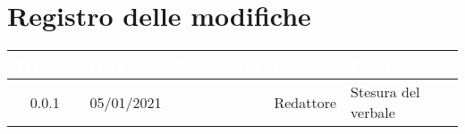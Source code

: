 \section*{Registro delle modifiche}
{
\renewcommand{\arraystretch}{1.5}
\centering
\begin{longtable}{c C{2.6cm}  C{2.6cm} C{2.6cm} C{3.5cm}}
\textcolor{white}{\textbf{Versione}}&
\textcolor{white}{\textbf{Data}}&
\textcolor{white}{\textbf{Nominativo}}&
\textcolor{white}{\textbf{Ruolo}}&
\textcolor{white}{\textbf{Descrizione}}\\	
\endhead
		

0.0.1 & 05/01/2021 & \SH{} & Redattore & Stesura del verbale\\


		
\end{longtable}
}
